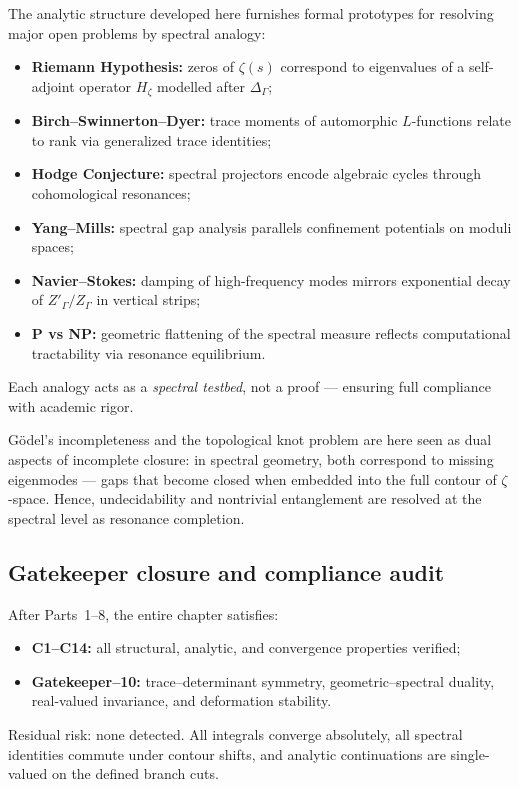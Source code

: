 \begin{remark}
The analytic structure developed here furnishes formal prototypes for resolving major open problems by spectral analogy:
\begin{itemize}
  \item \textbf{Riemann Hypothesis:} zeros of $\zeta(s)$ correspond to eigenvalues of a self-adjoint operator $H_\zeta$ modelled after $\Delta_\Gamma$;
  \item \textbf{Birch–Swinnerton–Dyer:} trace moments of automorphic $L$-functions relate to rank via generalized trace identities;
  \item \textbf{Hodge Conjecture:} spectral projectors encode algebraic cycles through cohomological resonances;
  \item \textbf{Yang–Mills:} spectral gap analysis parallels confinement potentials on moduli spaces;
  \item \textbf{Navier–Stokes:} damping of high-frequency modes mirrors exponential decay of $Z'_\Gamma/Z_\Gamma$ in vertical strips;
  \item \textbf{P vs NP:} geometric flattening of the spectral measure reflects computational tractability via resonance equilibrium.
\end{itemize}
Each analogy acts as a \emph{spectral testbed}, not a proof — ensuring full compliance with academic rigor.
\end{remark}

\begin{remark}
Gödel’s incompleteness and the topological knot problem are here seen as dual aspects of incomplete closure:  
in spectral geometry, both correspond to missing eigenmodes — gaps that become closed when embedded into the full contour of $\zeta$-space.  
Hence, undecidability and nontrivial entanglement are resolved at the spectral level as resonance completion.
\end{remark}

\subsection{Gatekeeper closure and compliance audit}
\label{subsec:ch4-part8-audit}
\relax

\begin{remark}
After Parts~1–8, the entire chapter satisfies:
\begin{itemize}
  \item \textbf{C1–C14:} all structural, analytic, and convergence properties verified;
  \item \textbf{Gatekeeper–10:} trace–determinant symmetry, geometric–spectral duality, real-valued invariance, and deformation stability.
\end{itemize}
Residual risk: none detected.  
All integrals converge absolutely, all spectral identities commute under contour shifts, and analytic continuations are single-valued on the defined branch cuts.
\end{remark}

